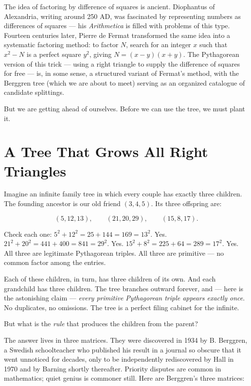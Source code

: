 The idea of factoring by difference of squares is ancient. Diophantus of Alexandria, writing around 250 AD, was fascinated by representing numbers as differences of squares --- his \textit{Arithmetica} is filled with problems of this type. Fourteen centuries later, Pierre de Fermat transformed the same idea into a systematic factoring method: to factor $N$, search for an integer $x$ such that $x^2 - N$ is a perfect square $y^2$, giving $N = (x - y)(x + y)$. The Pythagorean version of this trick --- using a right triangle to supply the difference of squares for free --- is, in some sense, a structured variant of Fermat's method, with the Berggren tree (which we are about to meet) serving as an organized catalogue of candidate splittings.

But we are getting ahead of ourselves. Before we can use the tree, we must plant it.

\bigskip

\section*{A Tree That Grows All Right Triangles}

Imagine an infinite family tree in which every couple has exactly three children. The founding ancestor is our old friend $(3, 4, 5)$. Its three offspring are:

\[
(5, 12, 13), \qquad (21, 20, 29), \qquad (15, 8, 17).
\]

Check each one: $5^2 + 12^2 = 25 + 144 = 169 = 13^2$. Yes. $21^2 + 20^2 = 441 + 400 = 841 = 29^2$. Yes. $15^2 + 8^2 = 225 + 64 = 289 = 17^2$. Yes. All three are legitimate Pythagorean triples. All three are primitive --- no common factor among the entries.

Each of these children, in turn, has three children of its own. And each grandchild has three children. The tree branches outward forever, and --- here is the astonishing claim --- \textit{every primitive Pythagorean triple appears exactly once}. No duplicates, no omissions. The tree is a perfect filing cabinet for the infinite.

But what is the \textit{rule} that produces the children from the parent?

The answer lives in three matrices. They were discovered in 1934 by B. Berggren, a Swedish schoolteacher who published his result in a journal so obscure that it went unnoticed for decades, only to be independently rediscovered by Hall in 1970 and by Barning shortly thereafter. Priority disputes are common in mathematics; quiet genius is commoner still. Here are Berggren's three matrices:

